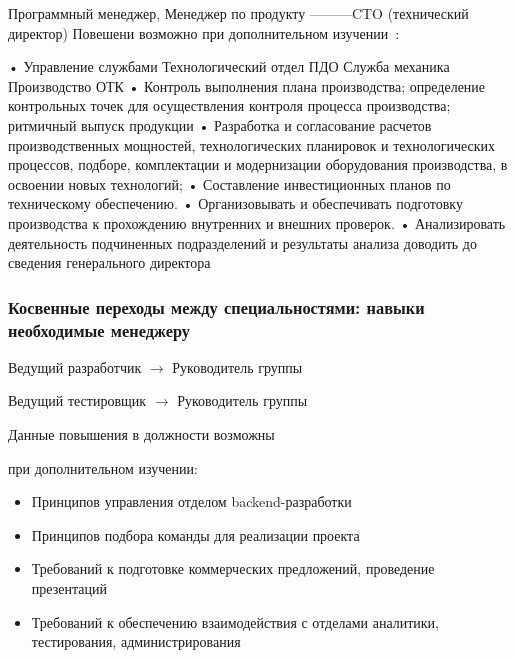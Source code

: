 \documentclass{../industrial-development}
\begin{document}
\lecturenotes

Программный менеджер, Менеджер по продукту ---------CTO (технический директор)
Повешени возможно при дополнительном изучении~\cite{rab}:
 
•	Управление службами
	Технологический отдел
	ПДО
Служба механика
	Производство
	ОТК
•	Контроль выполнения плана производства; определение контрольных точек для осуществления контроля процесса производства; ритмичный выпуск продукции
•	Разработка и согласование расчетов производственных мощностей, технологических планировок и технологических процессов, подборе, комплектации и модернизации оборудования производства, в освоении новых технологий;
•	Составление инвестиционных планов по техническому обеспечению.
•	Организовывать и обеспечивать подготовку производства к прохождению внутренних и внешних проверок.
•	Анализировать деятельность подчиненных подразделений и результаты анализа доводить до сведения генерального директора


\begin{frame} \frametitle{Косвенные переходы между специальностями: навыки необходимые менеджеру}

\begin{block}{Ведущий разработчик $\rightarrow$ Руководитель группы  

Ведущий тестировщик $\rightarrow$ Руководитель группы }

Данные повышения в должности возможны 

при дополнительном изучении:
  \end{block}
\begin{itemize}
  \item Принципов управления отделом backend-разработки
  \item Принципов подбора команды для реализации проекта
  \item Требований к подготовке коммерческих предложений, проведение презентаций
  \item Требований к обеспечению взаимодействия с отделами аналитики, тестирования, администрирования
  \end{itemize}
\end{frame}

\lecturenotes
\end{document}
